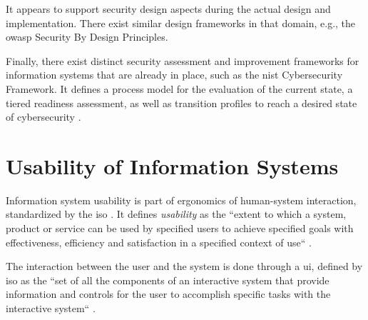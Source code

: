 It appears to support security design aspects during the actual design and implementation. There exist similar design frameworks in that domain, e.g., the \ac{owasp} Security By Design Principles. %

Finally, there exist distinct security assessment and improvement frameworks for information systems that are already in place, such as the \ac{nist} Cybersecurity Framework. It defines a process model for the evaluation of the current state, a tiered readiness assessment, as well as transition profiles to reach a desired state of cybersecurity \cite{noauthor_framework_2018}.%




\section{Usability of Information Systems} \label{sec:foundations-usability}

Information system usability is part of ergonomics of human-system interaction, standardized by the \ac{iso} \cite{noauthor_ergonomics_2020}. It defines \textit{usability} as the ``extent to which a system, product or service can be used by specified users to achieve specified goals with effectiveness, efficiency and satisfaction in a specified context of use`` \cite{noauthor_ergonomics_2020}.

The interaction between the user and the system is done through a \acf{ui}, defined by \ac{iso} as the ``set of all the components of an interactive system that provide information and controls for the user to accomplish specific tasks with the interactive system`` \cite{noauthor_ergonomics_2020}.

